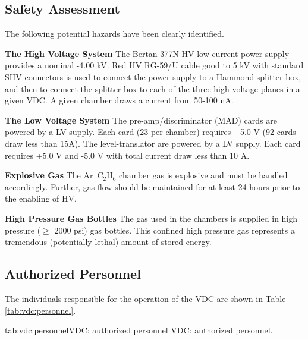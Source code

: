 \begin{safetyen}{5}{5}
\section{Safety Assessment}
The following potential hazards have been clearly identified.
\begin{description}
\item {\bf The High Voltage System}
The Bertan 377N HV low current power supply provides a nominal
-4.00 kV.  Red HV RG-59/U cable good to 5 kV with standard SHV
connectors is used to connect the power supply to a Hammond splitter
box, and then to connect the splitter box to each of the three high
voltage planes in a given VDC.  A given chamber draws a current
from  50-100 nA.
\item {\bf The Low Voltage System}
The pre-amp/discriminator (MAD) cards are powered by a LV supply. Each
card (23 per chamber) requires +5.0 V (92 cards draw less than
15A). The level-translator are powered by a LV supply. Each card
requires +5.0 V and -5.0 V with total current draw less than 10 A.
\item{\bf Explosive Gas} The Ar~C$_2$H$_6$ chamber gas is explosive
and must be handled accordingly.  Further, gas flow should be maintained
for at least 24 hours prior to the enabling of HV.
\item{\bf High Pressure Gas Bottles} The gas used in the chambers
is supplied in high pressure ($\ge$ 2000 psi) gas bottles. This
confined high pressure gas represents a tremendous (potentially lethal)
amount of stored energy.
\end{description}
\end{safetyen}

\begin{safetyen}{10}{15}
\section{Authorized Personnel}
\end{safetyen}

The individuals responsible for the operation 
of the VDC are shown in Table \ref{tab:vdc:personnel}.

\begin{namestab}{tab:vdc:personnel}{VDC: authorized personnel}{%
      VDC: authorized personnel.}
  \BogdanWojtsekhowski{}
\end{namestab}



